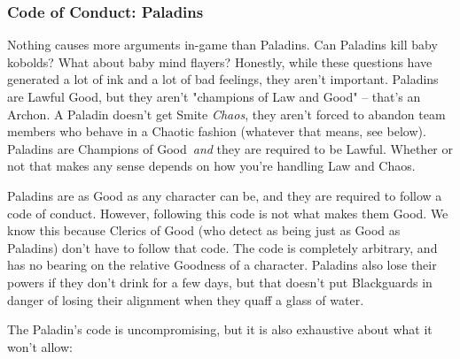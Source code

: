 \subsubsection{Code of Conduct: Paladins}
Nothing causes more arguments in-game than Paladins. Can Paladins kill baby kobolds? What about baby mind flayers? Honestly, while these questions have generated a lot of ink and a lot of bad feelings, they aren't important. Paladins are Lawful Good, but they aren't "champions of Law and Good" -- that's an Archon. A Paladin doesn't get Smite \textit{Chaos}, they aren't forced to abandon team members who behave in a Chaotic fashion (whatever that means, see below). Paladins are Champions of Good\texttrademark\ \textit{and} they are required to be Lawful. Whether or not that makes any sense depends on how you're handling Law and Chaos.

Paladins are as Good as any character can be, and they are required to follow a code of conduct. However, following this code is not what makes them Good. We know this because Clerics of Good (who detect as being just as Good as Paladins) don't have to follow that code. The code is completely arbitrary, and has no bearing on the relative Goodness of a character. Paladins also lose their powers if they don't drink for a few days, but that doesn't put Blackguards in danger of losing their alignment when they quaff a glass of water.

The Paladin's code is uncompromising, but it is also exhaustive about what it won't allow:

